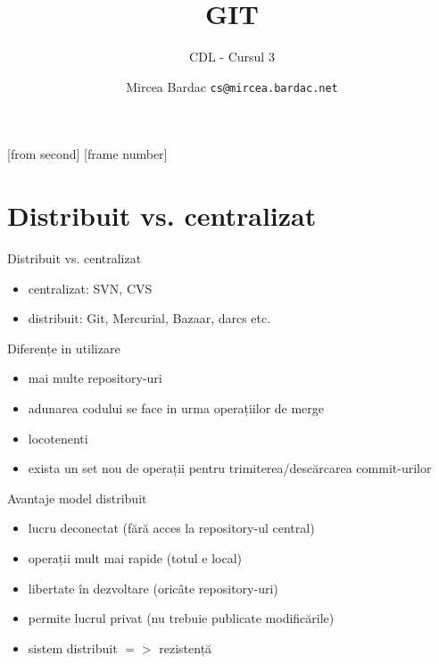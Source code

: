 \documentclass{beamer}
\title[GIT]{GIT}
\subtitle{CDL - Cursul 3}
\institute{ROSEdu}
\author{Mircea Bardac \texttt{cs@mircea.bardac.net}}
\begin{document}
[from second]
[frame number]

\frame{\titlepage}

\frame{\tableofcontents}

\section{Distribuit vs. centralizat}

\frame{\tableofcontents[currentsection]}

\begin{frame}{Distribuit vs. centralizat}
\begin{itemize} %
\item centralizat: SVN, CVS
\item distribuit: Git, Mercurial, Bazaar, darcs etc.
\end{itemize}
\end{frame}

\begin{frame}{Diferențe in utilizare}
\begin{itemize} %
\item mai multe repository-uri
\item adunarea codului se face in urma operațiilor de merge
\item locotenenti
\item exista un set nou de operații pentru trimiterea/descărcarea commit-urilor
\end{itemize}
\end{frame}



\begin{frame}{Avantaje model distribuit}
\begin{itemize} %
\item lucru deconectat (fără acces la repository-ul central)
\item operații mult mai rapide (totul e local)
\item libertate în dezvoltare (oricâte repository-uri)
\item permite lucrul privat (nu trebuie publicate modificările)
\item sistem distribuit $=>$ rezistență
\end{itemize}
\end{frame}
\end{document}
